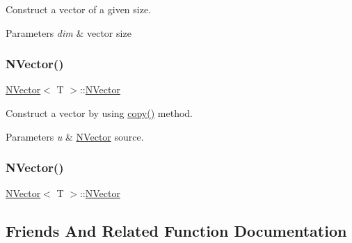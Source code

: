 Construct a vector of a given size. 


\begin{DoxyParams}{Parameters}
{\em dim} & vector size \\
\hline
\end{DoxyParams}
\mbox{\label{class_vector3_a7f648402b0fc9006ce9ced7ca647e600}} 
\subsubsection{\texorpdfstring{NVector()}{NVector()}\hspace{0.1cm}{\footnotesize\ttfamily [4/5]}}
{\footnotesize\ttfamily \mbox{\hyperlink{class_n_vector}{N\+Vector}}$<$ T $>$\+::\mbox{\hyperlink{class_n_vector}{N\+Vector}}\hspace{0.3cm}{\ttfamily [inline]}}



Construct a vector by using {\ttfamily \mbox{\hyperlink{class_n_vector_a67128d2ff536b8ccd7a95cb680bd0431}{copy()}}} method. 


\begin{DoxyParams}{Parameters}
{\em u} & {\ttfamily \mbox{\hyperlink{class_n_vector}{N\+Vector}}} source. \\
\hline
\end{DoxyParams}
\mbox{\label{class_vector3_a402111a5a467efd5741e6a17fbd5c903}} 
\subsubsection{\texorpdfstring{NVector()}{NVector()}\hspace{0.1cm}{\footnotesize\ttfamily [5/5]}}
{\footnotesize\ttfamily \mbox{\hyperlink{class_n_vector}{N\+Vector}}$<$ T $>$\+::\mbox{\hyperlink{class_n_vector}{N\+Vector}}\hspace{0.3cm}{\ttfamily [explicit]}}



\subsection{Friends And Related Function Documentation}
\mbox{\label{class_vector3_a09b6fd43617473072319da125cc1ece8}} 
